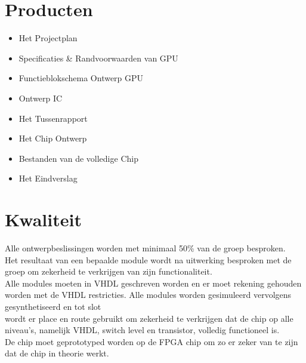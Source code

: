 \documentclass{article}
\begin{document}
\section{Producten}
\begin{itemize}
\item Het Projectplan
\item Specificaties \& Randvoorwaarden van GPU
\item Functieblokschema Ontwerp GPU
\item Ontwerp IC
\item Het Tussenrapport
\item Het Chip Ontwerp
\item Bestanden van de volledige Chip
\item Het Eindverslag
\end {itemize}

\section{Kwaliteit}
Alle ontwerpbeslissingen worden met minimaal 50\% van de groep besproken.
\\Het resultaat van een bepaalde module wordt na uitwerking besproken met de groep om zekerheid te verkrijgen van zijn functionaliteit.
\\Alle modules moeten in VHDL geschreven worden en er moet rekening gehouden worden met de VHDL restricties. Alle modules worden gesimuleerd vervolgens gesynthetiseerd en tot slot \\wordt er place en route gebruikt om zekerheid te verkrijgen dat de chip op alle niveau's, namelijk VHDL, switch level en transistor, volledig functioneel is.
\\De chip moet geprototyped worden op de FPGA chip om zo er zeker van te zijn dat de chip in theorie werkt.
\end{document}
